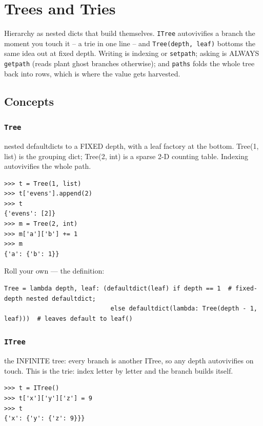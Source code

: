 \documentclass[10pt,letterpaper]{book}
\begin{document}

\clearpage
\chapter{Trees and Tries}

Hierarchy as nested dicts that build themselves. \texttt{ITree} autovivifies
a branch the moment you touch it -- a trie in one line -- and
\texttt{Tree(depth, leaf)} bottoms the same idea out at fixed depth.
Writing is indexing or \texttt{setpath}; asking is ALWAYS \texttt{getpath}
(reads plant ghost branches otherwise); and \texttt{paths} folds the whole
tree back into rows, which is where the value gets harvested.
\section{Concepts}
\subsection{\texttt{Tree}}\label{def:Tree}
nested defaultdicts to a FIXED depth, with a leaf factory at the bottom. Tree(1, list) is the grouping dict; Tree(2, int) is a sparse 2-D counting table. Indexing autovivifies the whole path.
\begin{lstlisting}[style=ex]
>>> t = Tree(1, list)
>>> t['evens'].append(2)
>>> t
{'evens': [2]}
>>> m = Tree(2, int)
>>> m['a']['b'] += 1
>>> m
{'a': {'b': 1}}
\end{lstlisting}

Roll your own --- the definition:

\begin{lstlisting}[style=ex]
Tree = lambda depth, leaf: (defaultdict(leaf) if depth == 1  # fixed-depth nested defaultdict;
                             else defaultdict(lambda: Tree(depth - 1, leaf)))  # leaves default to leaf()
\end{lstlisting}

\subsection{\texttt{ITree}}\label{def:ITree}
the INFINITE tree: every branch is another ITree, so any depth autovivifies on touch. This is the trie: index letter by letter and the branch builds itself.
\begin{lstlisting}[style=ex]
>>> t = ITree()
>>> t['x']['y']['z'] = 9
>>> t
{'x': {'y': {'z': 9}}}
\end{lstlisting}
\end{document}

